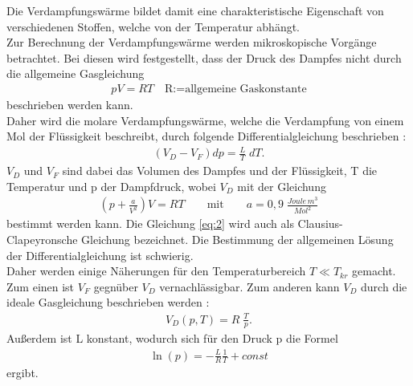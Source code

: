 Die Verdampfungswärme bildet damit eine charakteristische Eigenschaft von verschiedenen Stoffen,
welche von der Temperatur abhängt.\\
Zur Berechnung der Verdampfungswärme werden mikroskopische Vorgänge betrachtet. Bei diesen
wird festgestellt, dass der Druck des Dampfes nicht durch die allgemeine Gasgleichung \cite{V203}
\begin{align}
    pV=RT \label{eq:1} \quad \text{R:=allgemeine Gaskonstante}
\end{align}
beschrieben werden kann. \\
Daher wird die molare Verdampfungswärme, welche die Verdampfung von einem Mol der Flüssigkeit
beschreibt, durch folgende Differentialgleichung beschrieben \cite{V203}:
\begin{align}
    \left(V_D - V_F\right)dp=\frac{L}{T} \; dT \label{eq:2}.
\end{align}
$V_D$ und $V_F$ sind dabei das Volumen des Dampfes und der Flüssigkeit, T die Temperatur und p der Dampfdruck,
wobei $V_D$ mit der Gleichung \cite{V203}
\begin{align}
    \left(p+\frac{a}{V^2}\right)V=RT \qquad \text{mit} \qquad a=0,9 \;\frac{Joule\,m^3}{Mol^2} \label{eq:3}
\end{align}
bestimmt werden kann.
Die Gleichung \eqref{eq:2} wird auch als Clausius-Clapeyronsche Gleichung bezeichnet.
Die Bestimmung der allgemeinen Lösung der Differentialgleichung ist schwierig. \\
Daher werden einige Näherungen für den Temperaturbereich $T \ll T_{kr}$ gemacht.
Zum einen ist $V_F$ gegnüber $V_D$ vernachlässigbar.
Zum anderen kann $V_D$ durch die ideale Gasgleichung beschrieben werden \cite{V203}:
\begin{align}
    V_D(p,T)=R \; \frac{T}{p} \label{eq:4}.
\end{align}
Außerdem ist L konstant, wodurch sich für den Druck p die Formel \cite{V203}
\begin{align}
    \ln(p)=- \frac{L}{R} \frac{1}{T}+const \label{eq:5}
\end{align}
ergibt.
\newpage


